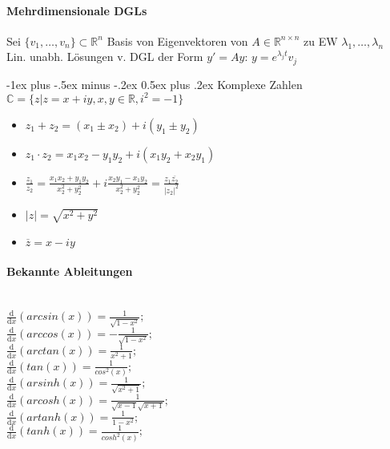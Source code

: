 \documentclass[paper=a3,paper=landscape, fontsize=9pt,DIV=30]{scrartcl}
\makeatletter
\newcommand{\real}{{\mathbb{R}}}
\newcommand{\compl}{\mathbb{C}}
\renewcommand{\section}{\@startsection{section}{1}{0mm}%
  {-1ex plus -.5ex minus -.2ex}%
  {0.5ex plus .2ex}%
  {\color{blue}\normalfont\large\bfseries}}
\makeatother
\begin{document}
\begin{multicols*}{4}

  \paragraph{Mehrdimensionale DGLs}
  Sei $\{v_1, \dots, v_n\} \subset \real^n$ Basis von Eigenvektoren von $A \in \real^{n\times n}$ zu EW $\lambda_1, \dots, \lambda_n$\\
  Lin. unabh. Lösungen v. DGL der Form $y'=Ay$: $y=e^{\lambda_jt}v_j$

  \section{Komplexe Zahlen}
  $\compl = \{z \vert z=x+iy, x,y \in \real, i^2=-1\}$
  \begin{itemize}
  	\item $z_1+z_2 = (x_1 \pm x_2)+i(y_1 \pm y_2)$
  	\item $z_1 \cdot z_2 = x_1x_2-y_1y_2+i(x_1y_2+x_2y_1)$
  	\item $\displaystyle \frac{z_1}{z_2} = \frac{x_1x_2+y_1y_2}{x_2^2+y_2^2} + i \frac{x_2y_1-x_1y_2}{x_2^2+y_2^2} = \frac{z_1\overline{z_2}}{\lvert z_2 \rvert^2}$
  	\item $\lvert z \rvert = \sqrt{x^2+y^2}$
  	\item $\overline{z} = x-iy$
        \end{itemize}

        \paragraph{Bekannte Ableitungen}

        \begin{multicols*}{2}
        \hspace{0pt}\\$\frac{\mathrm d}{\mathrm d x} \left( arcsin(x) \right) = \frac{1}{\sqrt{1-x^2}};$\\
        $\frac{\mathrm d}{\mathrm d x} \left( arccos(x) \right) = -\frac{1}{\sqrt{1-x^2}};$\\
        $\frac{\mathrm d}{\mathrm d x} \left( arctan(x) \right) = \frac{1}{x^2+1};$\\
        $\frac{\mathrm d}{\mathrm d x} \left( tan(x)    \right) = \frac{1}{cos^2(x)};$\\
        $\frac{\mathrm d}{\mathrm d x} \left( arsinh(x) \right) = \frac{1}{\sqrt{x^2+1}};$\\
        $\frac{\mathrm d}{\mathrm d x} \left( arcosh(x) \right) = \frac{1}{\sqrt{x-1}\sqrt{x+1}};$\\
        $\frac{\mathrm d}{\mathrm d x} \left( artanh(x) \right) = \frac{1}{1-x^2};$\\
        $\frac{\mathrm d}{\mathrm d x} \left( tanh(x)   \right) = \frac{1}{cosh^2(x)};$\\


\end{multicols*}
\end{multicols*}
\end{document}
